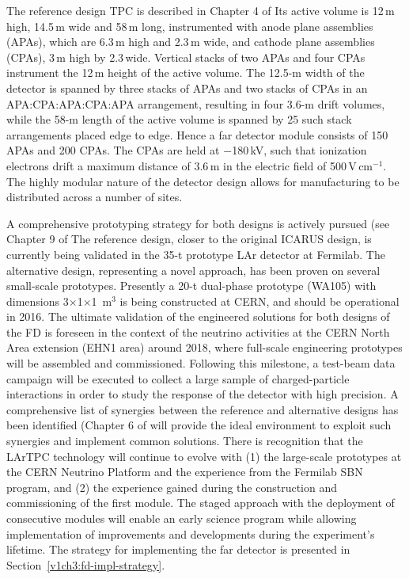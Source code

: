 The  reference design TPC is described in Chapter 4 of %
Its active volume is 12\,m high, 14.5\,m wide and 
58\,m long, instrumented with anode plane assemblies (APAs), 
which are 6.3\,m high and 2.3\,m wide, and cathode plane assemblies (CPAs), 3\,m high by 2.3\,wide. 
Vertical stacks of
two APAs and four CPAs %
instrument the 12\,m height of the active volume. The 12.5-m width of the detector is 
spanned by three stacks of APAs and two stacks of CPAs in an APA:CPA:APA:CPA:APA
arrangement, resulting in four 3.6-m drift volumes, while the 58-m length of the active volume
is spanned by 25 such stack arrangements placed edge to edge. Hence a  
far detector module consists of 150 APAs and 200 CPAs. The CPAs are held at $-$180\,kV, such that 
ionization electrons drift a maximum distance of 3.6\,m in the electric field of 500\,V\,cm$^{-1}$.
The highly modular nature of the detector design allows for manufacturing to be distributed across a number of sites.

A  comprehensive prototyping strategy for both designs is actively pursued (see Chapter 9 of %
The reference design, closer to the original ICARUS design, is currently being validated in the 35-t prototype 
LAr detector at Fermilab.  The alternative design, representing a novel approach, has been proven on several
small-scale prototypes. Presently
a 20-t dual-phase prototype (WA105) with dimensions 3$\times$1$\times$1~m$^3$ is being constructed at CERN,  
and should be operational in 2016. 
The ultimate validation of the engineered solutions for both designs of the FD is foreseen in
the context of the neutrino activities at the CERN North Area extension (EHN1 area) around 2018, 
where full-scale engineering prototypes will be 
assembled and commissioned. Following this milestone, a test-beam data 
campaign will be executed %
to collect a large sample of charged-particle interactions
in order to study the response of the detector with high precision.
A comprehensive list of synergies between the reference and alternative designs has been identified (Chapter 6 of %
will
provide the ideal environment to exploit such synergies and implement common solutions.
There is recognition that the LArTPC technology will continue to evolve with (1) the large-scale prototypes at the CERN Neutrino Platform and the experience from the Fermilab SBN program, and (2) the experience gained during the construction and commissioning of the first  module. 
The staged approach with the deployment of consecutive modules will
enable an early science program while allowing implementation of improvements and developments  during the experiment's lifetime.
The strategy for implementing
the far detector is presented in Section~\ref{v1ch3:fd-impl-strategy}.

